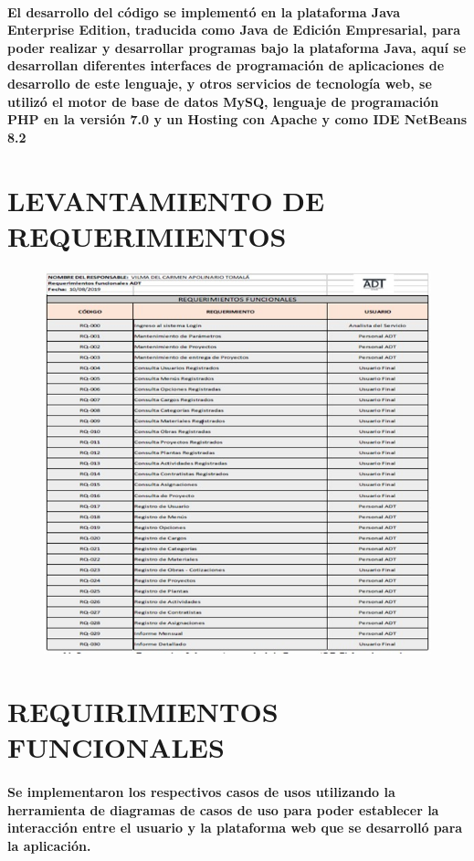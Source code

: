 \documentclass[12pt,a4paper]{article}
\begin{document}
\paragraph{El desarrollo del código se implementó en la plataforma Java Enterprise Edition, traducida como Java de Edición Empresarial, para poder realizar y desarrollar programas bajo la plataforma Java, aquí se desarrollan diferentes interfaces de programación de aplicaciones de desarrollo de este lenguaje, y otros servicios de tecnología web, se utilizó el motor de base de datos MySQ, lenguaje de programación PHP en la versión 7.0 y un Hosting con Apache y como IDE NetBeans 8.2}

\section*{LEVANTAMIENTO DE REQUERIMIENTOS}
\begin{figure}[hbtp]
\caption{}
\centering
\includegraphics[scale=0.3]{SEGUNDA.jpeg}
\end{figure}


\section*{REQUIRIMIENTOS FUNCIONALES}
\paragraph{Se implementaron los respectivos casos de usos utilizando la herramienta de diagramas de casos de uso para poder establecer la interacción entre el usuario y la plataforma web que se desarrolló para la aplicación.}
\end{document}
